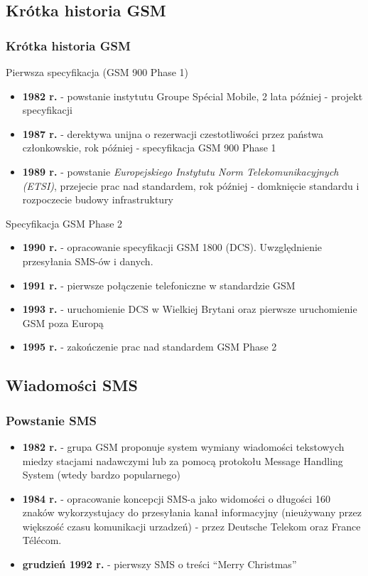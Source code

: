 \documentclass[xcolor=table]{beamer}
\begin{document}
\subsection{Krótka historia GSM}
\begin{frame}[allowframebreaks]
  \frametitle{Krótka historia GSM}

  Pierwsza specyfikacja (GSM 900 Phase 1)
  \begin{itemize}
    \item \textbf{1982 r.} - powstanie instytutu Groupe Spécial Mobile, 2 lata
      później - projekt specyfikacji
    \item \textbf{1987 r.} - derektywa unijna o rezerwacji czestotliwości przez
      państwa członkowskie, rok później - specyfikacja GSM 900 Phase 1
    \item \textbf{1989 r.} - powstanie \emph{Europejskiego Instytutu Norm
      Telekomunikacyjnych (ETSI)}, przejecie prac nad standardem, rok później -
      domknięcie standardu i rozpoczecie budowy infrastruktury
  \end{itemize}

  \framebreak

  Specyfikacja GSM Phase 2
  \begin{itemize}
    \item \textbf{1990 r.} - opracowanie specyfikacji GSM 1800 (DCS).
      Uwzględnienie przesyłania SMS-ów i danych.
    \item \textbf{1991 r.} - pierwsze połączenie telefoniczne w standardzie GSM
    \item \textbf{1993 r.} - uruchomienie DCS w Wielkiej Brytani oraz pierwsze
      uruchomienie GSM poza Europą
    \item \textbf{1995 r.} - zakończenie prac nad standardem GSM Phase 2
  \end{itemize}
\end{frame}

\subsection{Wiadomości SMS}

\begin{frame}
  \frametitle{Powstanie SMS}

  \begin{itemize}
    \item \textbf{1982 r.} - grupa GSM proponuje system wymiany wiadomości
      tekstowych miedzy stacjami nadawczymi lub za pomocą protokołu Message
      Handling System (wtedy bardzo popularnego)
    \item \textbf{1984 r.} - opracowanie koncepcji SMS-a jako widomości o
      długości 160 znaków wykorzystujacy do przesyłania kanał informacyjny
      (nieużywany przez większość czasu komunikacji urzadzeń) - przez Deutsche
      Telekom oraz France Télécom.
    \item \textbf{grudzień 1992 r.} - pierwszy SMS o treści ``Merry
      Christmas''
  \end{itemize}
\end{frame}
\end{document}
